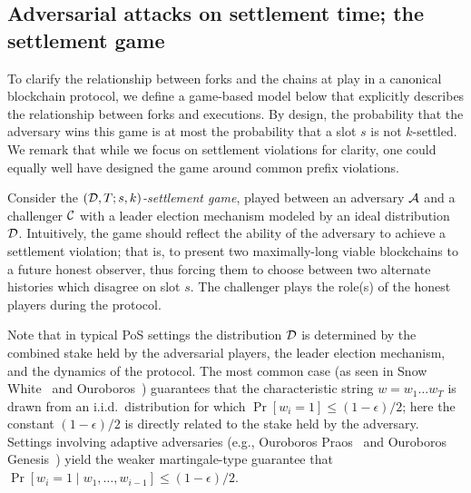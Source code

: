 \subsection{Adversarial attacks on settlement time; the settlement game}\label{sec:game} 

To clarify the relationship between forks and the chains at play in a
canonical blockchain protocol, we define a game-based model below that
explicitly describes the relationship between forks and executions.
By design, the probability that the adversary wins this game is at
most the probability that a slot $s$ is not $k$-settled. We remark
that while we focus on settlement violations for clarity, one could
equally well have designed the game around common prefix violations.

Consider the \emph{$(\mathcal{D},T;s,k)$-settlement game}, played
between an adversary $\mathcal{A}$ and a challenger $\mathcal{C}$ with
a leader election mechanism modeled by an ideal distribution
$\mathcal{D}$. Intuitively, the game should reflect the ability of
the adversary to achieve a settlement violation; that is, to present
two maximally-long viable blockchains to a future honest observer,
thus forcing them to choose between two alternate histories which
disagree on slot $s$.
The challenger plays the role(s) of the honest players during the
protocol.

Note that in typical PoS settings the distribution $\mathcal{D}$ is
determined by the combined stake held by the adversarial players, the
leader election mechanism, and the dynamics of the protocol. The most
common case (as seen in Snow White~\cite{DBLP:conf/asiacrypt/PassS17}
and Ouroboros~\cite{KRDO17}) guarantees that the characteristic string
$w = w_1 \ldots w_T$ is drawn from an i.i.d.\ distribution for which
$\Pr[w_i = 1] \leq (1 - \epsilon)/2$; here the constant
$(1-\epsilon)/2$ is directly related to the stake held by the
adversary. Settings involving adaptive adversaries (e.g., Ouroboros
Praos~\cite{DBLP:conf/eurocrypt/DavidGKR18} and Ouroboros
Genesis~\cite{DBLP:journals/iacr/BadertscherGKRZ18}) yield the weaker
martingale-type guarantee that
$\Pr[w_i = 1 \mid w_1, \ldots, w_{i-1}] \leq (1 - \epsilon)/2$.


